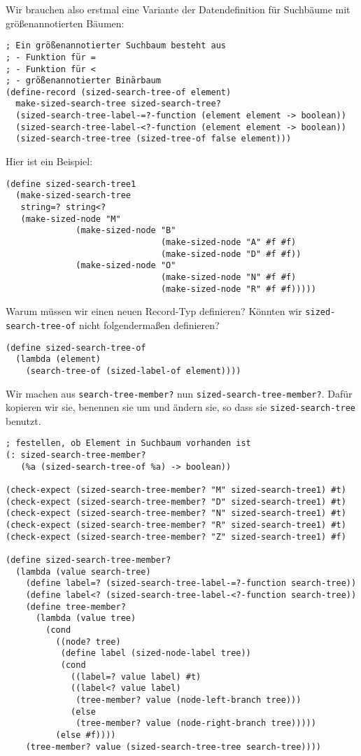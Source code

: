 Wir brauchen also erstmal eine Variante der Datendefinition für
Suchbäume mit größenannotierten Bäumen:
%
\begin{lstlisting}
; Ein größenannotierter Suchbaum besteht aus
; - Funktion für =
; - Funktion für <
; - größenannotierter Binärbaum
(define-record (sized-search-tree-of element)
  make-sized-search-tree sized-search-tree?
  (sized-search-tree-label-=?-function (element element -> boolean))
  (sized-search-tree-label-<?-function (element element -> boolean))
  (sized-search-tree-tree (sized-tree-of false element)))
\end{lstlisting}
%
Hier ist ein Beispiel:
%
\begin{lstlisting}
(define sized-search-tree1
  (make-sized-search-tree
   string=? string<?
   (make-sized-node "M"
              (make-sized-node "B"
                               (make-sized-node "A" #f #f)
                               (make-sized-node "D" #f #f))
              (make-sized-node "O"
                               (make-sized-node "N" #f #f)
                               (make-sized-node "R" #f #f)))))
\end{lstlisting}
% 
\begin{aufgabeinline}
  Warum müssen wir einen neuen Record-Typ definieren?  Könnten wir
  \lstinline{sized-search-tree-of} nicht folgendermaßen definieren?
\begin{lstlisting}
(define sized-search-tree-of
  (lambda (element)
    (search-tree-of (sized-label-of element))))
\end{lstlisting}
  \vspace*{-4ex}
\end{aufgabeinline}
%
Wir machen aus
\lstinline{search-tree-member?} nun
\lstinline{sized-search-tree-member?}.  Dafür kopieren
wir sie, benennen sie um und ändern sie, so dass sie
\lstinline{sized-search-tree} benutzt.\label{func:sized-search-tree-member}
%
\begin{lstlisting}
; festellen, ob Element in Suchbaum vorhanden ist
(: sized-search-tree-member? 
   (%a (sized-search-tree-of %a) -> boolean))

(check-expect (sized-search-tree-member? "M" sized-search-tree1) #t)
(check-expect (sized-search-tree-member? "D" sized-search-tree1) #t)
(check-expect (sized-search-tree-member? "N" sized-search-tree1) #t)
(check-expect (sized-search-tree-member? "R" sized-search-tree1) #t)
(check-expect (sized-search-tree-member? "Z" sized-search-tree1) #f)

(define sized-search-tree-member?
  (lambda (value search-tree)
    (define label=? (sized-search-tree-label-=?-function search-tree))
    (define label<? (sized-search-tree-label-<?-function search-tree))
    (define tree-member?
      (lambda (value tree)
        (cond
          ((node? tree)
           (define label (sized-node-label tree))
           (cond
             ((label=? value label) #t)
             ((label<? value label)
              (tree-member? value (node-left-branch tree)))
             (else
              (tree-member? value (node-right-branch tree)))))
          (else #f))))
    (tree-member? value (sized-search-tree-tree search-tree))))
\end{lstlisting}
